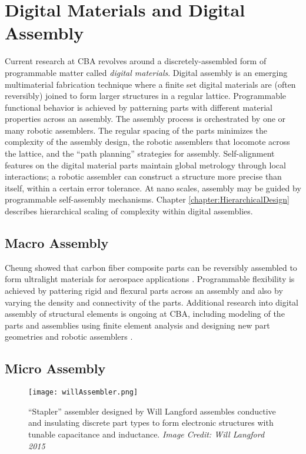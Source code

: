 {\section{Digital Materials and Digital Assembly}
Current research at CBA revolves around a discretely-assembled form of programmable matter called \textit{digital materials}.    Digital assembly is an emerging multimaterial fabrication technique where a finite set digital materials are (often reversibly) joined to form larger structures in a regular lattice.  Programmable functional behavior is achieved by patterning parts with different material properties across an assembly.  The assembly process is orchestrated by one or many robotic assemblers.  The regular spacing of the parts minimizes the complexity of the assembly design, the robotic assemblers that locomote across the lattice, and the ``path planning'' strategies for assembly.  Self-alignment features on the digital material parts maintain global metrology through local interactions; a robotic assembler can construct a structure more precise than itself, within a certain error tolerance.  At nano scales, assembly may be guided by programmable self-assembly mechanisms.  Chapter \ref{chapter:HierarchicalDesign} describes hierarchical scaling of complexity within digital assemblies.  

\subsection{Macro Assembly}

Cheung showed that carbon fiber composite parts can be reversibly assembled to form ultralight materials for aerospace applications \cite{Cheung2013}.  Programmable flexibility is achieved by pattering rigid and flexural parts across an assembly and also by varying the density and connectivity of the parts.  Additional research into digital assembly of structural elements is ongoing at CBA, including modeling of the parts and assemblies using finite element analysis \cite{Calisch2014} and designing new part geometries and robotic assemblers \cite{Carney2015}.

\subsection{Micro Assembly}

\begin{figure}
  \texttt{[image: willAssembler.png]}
  \caption{``Stapler'' assembler designed by Will Langford assembles conductive and insulating discrete part types to form electronic structures with tunable capacitance and inductance.  \textit{Image Credit: Will Langford 2015}}
  \label{fig:willAssembler}
\end{figure}


}
